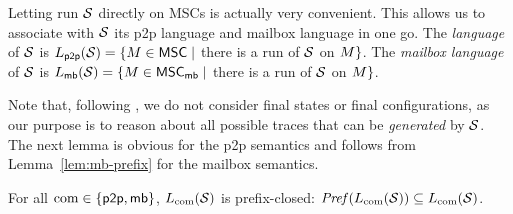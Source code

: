 \documentclass{article}
\begin{document}
Letting run $\mathcal{S}$ directly on MSCs is actually very convenient.
This allows us to associate with $\mathcal{S}$ its p2p language and mailbox language
in one go. The \emph{\pp language} of $\mathcal{S}$ is $L_{\mathsf{p2p}}(\mathcal{S}) = \{M \in \mathsf{MSC} \mid$ there is a run of $\mathcal{S}$ on $M\}$.
The \emph{mailbox language} of $\mathcal{S}$ is $L_{\mathsf{mb}}(\mathcal{S}) = \{M \in \mathsf{MSC}_{\mathsf{mb}} \mid$ there is a run of $\mathcal{S}$ on $M\}$.

Note that, following \cite{DBLP:conf/cav/BouajjaniEJQ18,DBLP:conf/fossacs/GiustoLL20},
we do not consider final states or final configurations, as our purpose is to
reason about all possible
traces that can be \emph{generated} by $\mathcal{S}$.
The next lemma is obvious for the p2p semantics and follows from Lemma~\ref{lem:mb-prefix} for
	the mailbox semantics.

\begin{lemma}\label{lem:prefix-closed}
For all $\textup{com} \in \{\mathsf{p2p}, \mathsf{mb}\}$, $L_{\textup{com}}(\mathcal{S})$ is prefix-closed:
$\mathit{Pref}(L_{\textup{com}}(\mathcal{S})) \subseteq L_{\textup{com}}(\mathcal{S})$.
\end{lemma}
\end{document}
